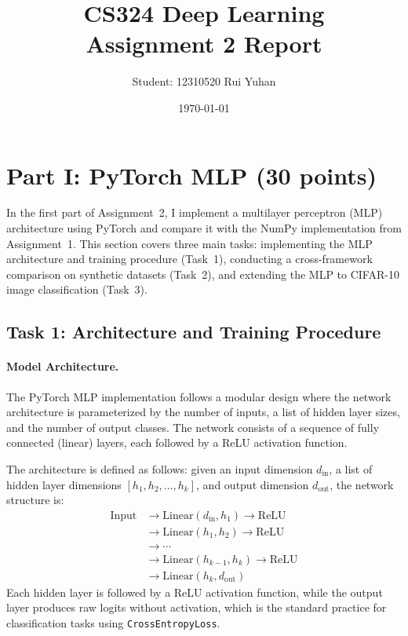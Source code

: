 \documentclass[11pt,a4paper]{article}
\title{CS324 Deep Learning\\Assignment 2 Report}
\author{Student: 12310520 Rui Yuhan}
\date{\today}
\begin{document}
\maketitle

\section{Part I: PyTorch MLP (30 points)}
In the first part of Assignment~2, I implement a multilayer perceptron (MLP) architecture using PyTorch and compare it with the NumPy implementation from Assignment~1. This section covers three main tasks: implementing the MLP architecture and training procedure (Task~1), conducting a cross-framework comparison on synthetic datasets (Task~2), and extending the MLP to CIFAR-10 image classification (Task~3).

\subsection{Task 1: Architecture and Training Procedure}
\paragraph{Model Architecture.} The PyTorch MLP implementation follows a modular design where the network architecture is parameterized by the number of inputs, a list of hidden layer sizes, and the number of output classes. The network consists of a sequence of fully connected (linear) layers, each followed by a ReLU activation function. 

The architecture is defined as follows: given an input dimension $d_{\text{in}}$, a list of hidden layer dimensions $[h_1, h_2, \ldots, h_k]$, and output dimension $d_{\text{out}}$, the network structure is:
\begin{align*}
\text{Input} &\rightarrow \text{Linear}(d_{\text{in}}, h_1) \rightarrow \text{ReLU} \\
&\rightarrow \text{Linear}(h_1, h_2) \rightarrow \text{ReLU} \\
&\rightarrow \cdots \\
&\rightarrow \text{Linear}(h_{k-1}, h_k) \rightarrow \text{ReLU} \\
&\rightarrow \text{Linear}(h_k, d_{\text{out}})
\end{align*}
Each hidden layer is followed by a ReLU activation function, while the output layer produces raw logits without activation, which is the standard practice for classification tasks using \texttt{CrossEntropyLoss}. 
\end{document}
